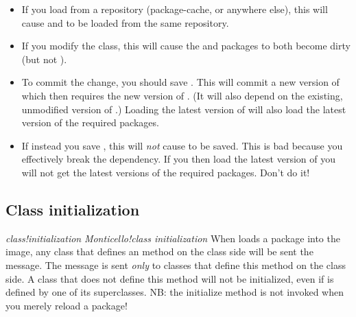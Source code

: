 \documentclass[a4paper,10pt,twoside]{book}
\begin{document}
\begin{itemize}
\item If you load  from a repository (package-cache, or anywhere else), this will cause  and  to be loaded from the same repository.
\item If you modify the  class, this will cause the  and  packages to both become dirty (but not ).
\item To commit the change, you should save . This will commit a new version of  which then requires the new version of . (It will also depend on the existing, unmodified version of .)  Loading the latest version of  will also load the latest version of the required packages.
\item If instead you save , this will \emph{not} cause  to be saved.  This is bad because you effectively break the dependency.  If you then load the latest version of  you will not get the latest versions of the required packages. Don't do it!
\end{itemize}

\subsection{Class initialization}

\emph{class!initialization}
\emph{Monticello!class initialization}
When \MC loads a package into the image, any class that defines an  method on the class side will be sent the  message. The message is sent \emph{only} to classes that define this method on the class side. A class that does not define this method will not be initialized, even if  is defined by one of its superclasses. NB: the initialize method is not invoked when you merely reload a package!
\end{document}
